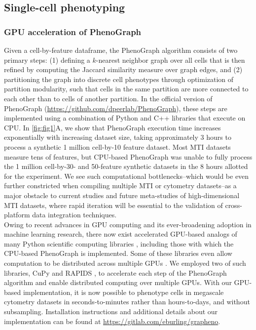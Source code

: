 \documentclass[preprint,review,3p,12pt]{elsarticle}
\begin{document}
\subsection{Single-cell phenotyping} \label{phenotyping}
\subsubsection{GPU acceleration of PhenoGraph}
Given a cell-by-feature dataframe, the PhenoGraph algorithm \cite{Levine2015} consists of two primary steps: (1) defining a $k$-nearest neighbor graph over all cells that is then refined by computing the Jaccard similarity measure over graph edges, and (2) partitioning the graph into discrete cell phenotypes through optimization of partition modularity, such that cells in the same partition are more connected to each other than to cells of another partition. In the official version of PhenoGraph (\url{https://github.com/dpeerlab/PhenoGraph}), these steps are implemented using a combination of Python and C++ libraries that execute on CPU. In \autoref{fig:fig1}A, we show that PhenoGraph execution time increases exponentially with increasing dataset size, taking approximately 3 hours to process a synthetic 1 million cell-by-10 feature dataset. Most MTI datasets measure tens of features, but CPU-based PhenoGraph was unable to fully process the 1 million cell-by-30- and 50-feature synthetic datasets in the 8 hours allotted for the experiment. We see such computational bottlenecks--which would be even further constricted when compiling multiple MTI or cytometry datasets--as a major obstacle to current studies and future meta-studies of high-dimensional MTI datasets, where rapid iteration will be essential to the validation of cross-platform data integration techniques. \\

Owing to recent advances in GPU computing and its ever-broadening adoption in machine learning research, there now exist accelerated GPU-based analogs of many Python scientific computing libraries \cite{cuml2020,cupy2017}, including those with which the CPU-based PhenoGraph is implemented. Some of these libraries even allow computation to be distributed across multiple GPUs \cite{cuml2020,dask}. We employed two of such libraries, CuPy \cite{cupy2017} and RAPIDS \cite{cuml2020}, to accelerate each step of the PhenoGraph algorithm and enable distributed computing over multiple GPUs. With our GPU-based implementation, it is now possible to phenotype cells in megascale cytometry datasets in seconds-to-minutes rather than hours-to-days, and without subsampling. Installation instructions and additional details about our implementation can be found at \url{https://gitlab.com/eburling/grapheno}.\\
\end{document}
